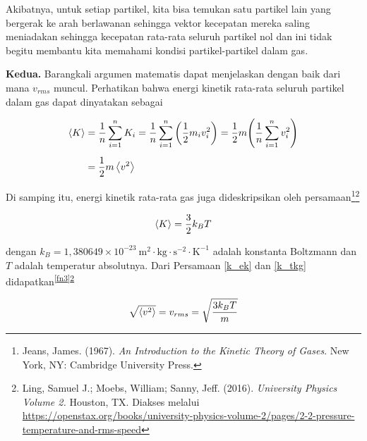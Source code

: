 \documentclass{article}
\begin{document}
\begin{multicols}{2}
		\par Akibatnya, untuk setiap partikel, kita bisa temukan satu partikel lain yang bergerak ke arah berlawanan sehingga vektor kecepatan mereka saling meniadakan sehingga kecepatan rata-rata seluruh partikel nol dan ini tidak begitu membantu kita memahami kondisi partikel-partikel dalam gas. \\
		
		\par 
		\textbf{Kedua.} Barangkali argumen matematis dapat menjelaskan dengan baik dari mana $v_{rms}$ muncul. Perhatikan bahwa energi kinetik rata-rata seluruh partikel dalam gas dapat dinyatakan sebagai

		\vspace{-1.5em}
		\begin{align}
			\allowdisplaybreaks
			\expval{K} &= \frac{1}{n} \sum_{i=1}^{n} K_i = \frac{1}{n} \sum_{i=1}^{n} \qty(\frac{1}{2} m_iv_i^2) = \frac{1}{2} m \qty(\frac{1}{n} \sum_{i=1}^{n} v_i^2) \notag \\[.5em]
			&= \frac{1}{2} m \expval{v^2} \label{k_ek}
		\end{align}
		
		\par Di samping itu, energi kinetik rata-rata gas juga dideskripsikan oleh persamaan\footnote{Jeans, James. (1967). \textit{An Introduction to the Kinetic Theory of Gases}. New York, NY: Cambridge University Press.\label{fn4}}\footnote{Ling, Samuel J.; Moebs, William; Sanny, Jeff. (2016). \textit{University Physics Volume 2.} Houston, TX. Diakses melalui \href{https://openstax.org/books/university-physics-volume-2/pages/2-2-pressure-temperature-and-rms-speed}{https://openstax.org/books/university-physics-volume-2/pages/2-2-pressure-temperature-and-rms-speed}\label{fn5}}
		
		\vspace{-1.5em}
		\begin{equation}
			\expval{K} = \frac{3}{2}k_BT \label{k_tkg}
		\end{equation}
		
		dengan $k_B = 1{,}380649 \times 10^{-23} \ \mathrm{m}^2 \cdot \mathrm{kg} \cdot \mathrm{s}^{-2} \cdot \mathrm{K}^{-1}$ adalah konstanta Boltzmann dan $T$ adalah temperatur absolutnya. Dari Persamaan \ref{k_ek} dan \ref{k_tkg} didapatkan\textsuperscript{\ref{fn3}}\textsuperscript{\ref{fn5}}
		
		\vspace{-.5em}
		\begin{equation}
			\sqrt{\expval{v^2}} = v_{rms} = \sqrt{\frac{3k_BT}{m}}
		\end{equation}
		

\end{multicols}
\end{document}
